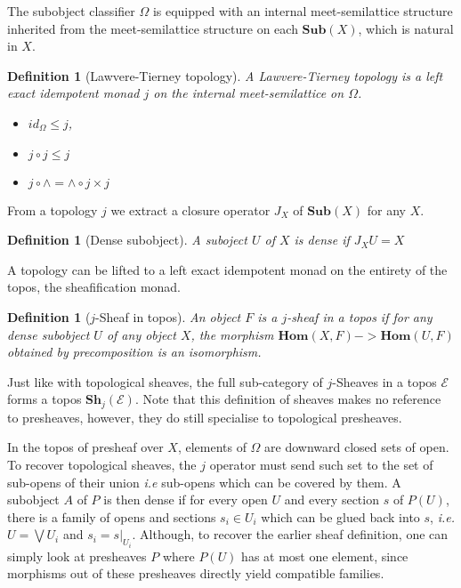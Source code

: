 \documentclass[11pt]{article}
\newtheorem{definition}[theorem]{Definition}
\newcommand{\0}{\mathbf{0}}
\newcommand{\1}{\mathbf{1}}
\begin{document}
The subobject classifier $\Omega$ is equipped with an internal meet-semilattice structure inherited from the meet-semilattice structure on each $\mathbf{Sub}(X)$, which is natural in $X$.

\begin{definition}[Lawvere-Tierney topology]
    A \emph{Lawvere-Tierney topology} is a left exact idempotent monad $j$ on the internal meet-semilattice on $\Omega$.
\begin{itemize}
    \item $ id_\Omega \leq j $,
    \item $ j\circ j \leq  j$
    \item $ j \circ \wedge = \wedge \circ j\times j$
\end{itemize}
\end{definition}

From a topology $j$ we extract a closure operator $J_X$ of $\mathbf{Sub}(X)$ for any $X$.
\begin{definition}[Dense subobject]
    A suboject $U$ of $X$ is dense if $J_XU  = X$
\end{definition}

A topology can be lifted to a left exact idempotent monad on the entirety of the topos, the sheafification monad.

\begin{definition}[$j$-Sheaf in topos]
    An object $F$ is a $j$-\emph{sheaf} in a topos if for any dense subobject $U$ of any object $X$, the morphism $\mathbf{Hom}(X, F) -> \mathbf{Hom}(U, F)$ obtained by precomposition is an isomorphism.
\end{definition}


Just like with topological sheaves, the full sub-category of $j$-Sheaves in a topos $\mathcal{E}$ forms a topos $\mathbf{Sh}_j(\mathcal{E})$. Note that this definition of sheaves makes no reference to presheaves, however, they do still specialise to topological presheaves.

In the topos of presheaf over $X$, elements of $\Omega$ are downward closed sets of open. To recover topological sheaves, the $j$ operator must send such set to the set of sub-opens of their union \emph{i.e} sub-opens which can be covered by them. A subobject $A$ of $P$ is then dense if for every open $U$ and every section $s$ of $P(U)$, there is a family of opens and sections $s_i\in U_i$ which can be glued back into $s$, \emph{i.e.} $U = \bigvee U_i$ and $s_i = s|_{U_i}$. Although, to recover the earlier sheaf definition, one can simply look at presheaves $P$ where $P(U)$ has at most one element, since morphisms out of these presheaves directly yield compatible families.
\end{document}
